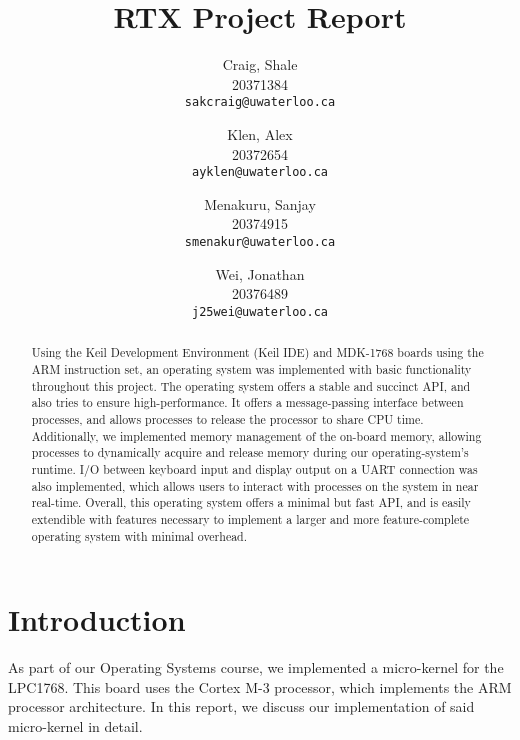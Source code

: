 \documentclass[12pt]{report}
\begin{document}

\title{RTX Project Report}

\author{
    Craig, Shale\\
    20371384\\
    \texttt{sakcraig@uwaterloo.ca}
    \and
    Klen, Alex\\
    20372654\\
    \texttt{ayklen@uwaterloo.ca}
    \and
    Menakuru, Sanjay\\
    20374915\\
    \texttt{smenakur@uwaterloo.ca}
    \and
    Wei, Jonathan\\
    20376489\\
    \texttt{j25wei@uwaterloo.ca}
}

\maketitle

\begin{abstract}
    Using the Keil Development Environment (Keil IDE) and MDK-1768 boards using
    the ARM instruction set, an operating system was implemented with basic
    functionality throughout this project. The operating system offers a stable
    and succinct API, and also tries to ensure high-performance.
    It offers a message-passing interface between processes, and allows
    processes to release the processor to share CPU time. Additionally, we
    implemented memory management of the on-board memory, allowing processes to
    dynamically acquire and release memory during our operating-system's
    runtime.
    I/O between keyboard input and display output on a UART connection was also
    implemented, which allows users to interact with processes on the system in
    near real-time. Overall, this operating system offers a minimal but fast
    API, and is easily extendible with features necessary to implement a larger
    and more feature-complete operating system with minimal overhead.
\end{abstract}

\tableofcontents
\listofalgorithms
\listoffigures



\part{Introduction}
    As part of our Operating Systems course, we implemented a micro-kernel for
    the LPC1768. This board uses the Cortex M-3 processor, which implements
    the ARM processor architecture. In this report, we discuss our
    implementation of said micro-kernel in detail.
\end{document}
